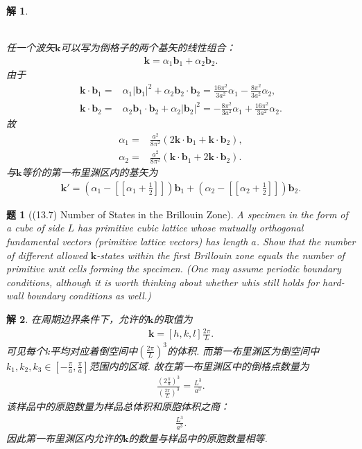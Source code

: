 \documentclass[UTF8,10pt,a4paper]{article}
\theoremstyle{Problem}
\newtheorem{prob}{题}
\theoremstyle{Solution}
\newtheorem*{sol}{解}
\providecommand{\abs}[1]{\left\lvert#1\right\rvert}
\begin{document}
\begin{sol}
\begin{enumerate}
\begin{figure}[h]
        \end{figure}
        \\任一个波矢$\bm{k}$可以写为倒格子的两个基矢的线性组合：
        \begin{align}
            \bm{k}=\alpha_1\bm{b}_1+\alpha_2\bm{b}_2.
        \end{align}
        由于
        \begin{align}
            \bm{k}\cdot\bm{b}_1=&\alpha_1\abs{\bm{b}_1}^2+\alpha_2\bm{b}_2\cdot\bm{b}_2=\frac{16\pi^2}{3a^2}\alpha_1-\frac{8\pi^2}{3a^2}\alpha_2,\\
            \bm{k}\cdot\bm{b}_2=&\alpha_2\bm{b}_1\cdot\bm{b}_2+\alpha_2\abs{\bm{b}_2}^2=-\frac{8\pi^2}{3a^2}\alpha_1+\frac{16\pi^2}{3a^2}\alpha_2.
        \end{align}
        故
        \begin{align}
            \alpha_1=&\frac{a^2}{8\pi^2}(2\bm{k}\cdot\bm{b}_1+\bm{k}\cdot\bm{b}_2),\\
            \alpha_2=&\frac{a^2}{8\pi^2}(\bm{k}\cdot\bm{b}_1+2\bm{k}\cdot\bm{b}_2).
        \end{align}
        与$\bm{k}$等价的第一布里渊区内的基矢为
        \begin{align}
            \bm{k}'=(\alpha_1-[[\alpha_1+\frac{1}{2}]])\bm{b}_1+(\alpha_2-[[\alpha_2+\frac{1}{2}]])\bm{b}_2.
        \end{align}
    \end{enumerate}
\end{sol}

\begin{prob}[(13.7) Number of States in the Brillouin Zone]
    A specimen in the form of a cube of side $L$ has primitive cubic lattice whose mutually orthogonal fundamental vectors (primitive lattice vectors) has length $a$. Show that the number of different allowed $\bm{k}$-states within the first Brillouin zone equals the number of primitive unit cells forming the specimen. (One may assume periodic boundary conditions, although it is worth thinking about whether whis still holds for hard-wall boundary conditions as well.)
\end{prob}
\begin{sol}
    在周期边界条件下，允许的$\bm{k}$的取值为
    \begin{align*}
        \bm{k}=[h,k,l]\frac{2\pi}{L}.
    \end{align*}
    可见每个$k$平均对应着倒空间中$\left(\frac{2\pi}{L}\right)^3$的体积. 而第一布里渊区为倒空间中$k_1,k_2,k_3\in[-\frac{\pi}{a},\frac{\pi}{a}]$范围内的区域. 故在第一布里渊区中的倒格点数量为
    \begin{align*}
        \frac{\left(2\frac{\pi}{a}\right)^3}{\left(\frac{2\pi}{L}\right)^3}=\frac{L^3}{a^3}.
    \end{align*}
    该样品中的原胞数量为样品总体积和原胞体积之商：
    \begin{align*}
        \frac{L^3}{a^3}.
    \end{align*}
    因此第一布里渊区内允许的$\bm{k}$的数量与样品中的原胞数量相等.
\end{sol}
\end{document}
